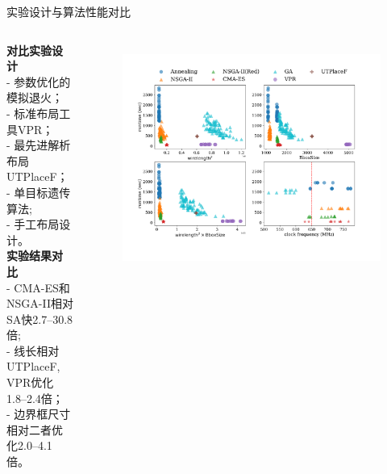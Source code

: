 \documentclass[10pt]{beamer}
\begin{document}
\begin{frame}{实验设计与算法性能对比}
  
  \begin{columns}[T, onlytextwidth]
    {\fontsize{7}{12}\selectfont
    
    {\bf 对比实验设计}\\

      - 参数优化的模拟退火；\\
      - 标准布局工具VPR；\\
      - 最先进解析布局UTPlaceF；\\
      - 单目标遗传算法;\\
      - 手工布局设计。\\
    
    {\bf 实验结果对比} \\
      - CMA-ES和NSGA-II相对SA快\alert{2.7--30.8}倍;\\
      - 线长相对UTPlaceF, VPR优化\alert{1.8--2.4}倍；\\
      - 边界框尺寸相对二者优化\alert{2.0--4.1}倍。
    }

    \vspace{-0.6cm}
    \begin{figure}
      \includegraphics[width=1.2\textwidth]{img/objective-runtime}
      \label{fig:objective}
    \end{figure}

  \end{columns}


\end{frame}
\end{document}
